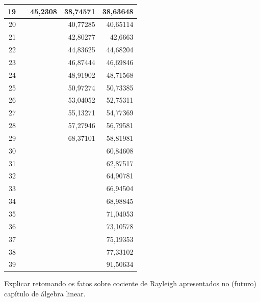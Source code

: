 \begin{table}[pt]
\begin{center}
\begin{tabular}{r|r|r|r|r}
					19 &            &    45,2308 &   38,74571 &   38,63648 \\
	\hline
					20 &            &            &   40,77285 &   40,65114 \\
	\hline
					21 &            &            &   42,80277 &    42,6663 \\
	\hline
					22 &            &            &   44,83625 &   44,68204 \\
	\hline
					23 &            &            &   46,87444 &   46,69846 \\
	\hline
					24 &            &            &   48,91902 &   48,71568 \\
	\hline
					25 &            &            &   50,97274 &   50,73385 \\
	\hline
					26 &            &            &   53,04052 &   52,75311 \\
	\hline
					27 &            &            &   55,13271 &   54,77369 \\
	\hline
					28 &            &            &   57,27946 &   56,79581 \\
	\hline
					29 &            &            &   68,37101 &   58,81981 \\
	\hline
					30 &            &            &            &   60,84608 \\
	\hline
					31 &            &            &            &   62,87517 \\
	\hline
					32 &            &            &            &   64,90781 \\
	\hline
					33 &            &            &            &   66,94504 \\
	\hline
					34 &            &            &            &   68,98845 \\
	\hline
					35 &            &            &            &   71,04053 \\
	\hline
					36 &            &            &            &   73,10578 \\
	\hline
					37 &            &            &            &   75,19353 \\
	\hline
					38 &            &            &            &   77,33102 \\
	\hline
					39 &            &            &            &   91,50634 \\
	\hline \hline
	\end{tabular}
	\end{center}  
\end{table}
	
	
	Explicar retomando os fatos sobre cociente de Rayleigh apresentados no (futuro) capítulo de álgebra linear.
	
